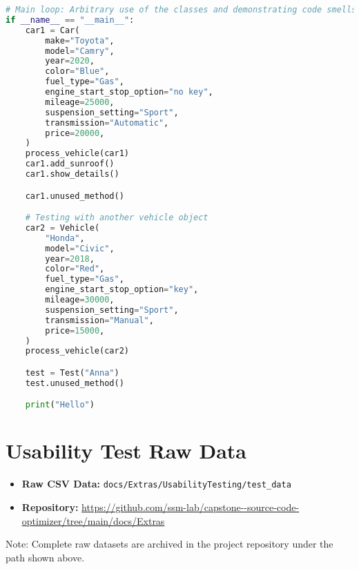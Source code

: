\documentclass{article}
\begin{document}
\begin{lstlisting}[language=Python,caption={Complex Class Structures (sample.py)},label=lst:task7]
# Main loop: Arbitrary use of the classes and demonstrating code smells
if __name__ == "__main__":
    car1 = Car(
        make="Toyota",
        model="Camry",
        year=2020,
        color="Blue",
        fuel_type="Gas",
        engine_start_stop_option="no key",
        mileage=25000,
        suspension_setting="Sport",
        transmission="Automatic",
        price=20000,
    )
    process_vehicle(car1)
    car1.add_sunroof()
    car1.show_details()

    car1.unused_method()

    # Testing with another vehicle object
    car2 = Vehicle(
        "Honda",
        model="Civic",
        year=2018,
        color="Red",
        fuel_type="Gas",
        engine_start_stop_option="key",
        mileage=30000,
        suspension_setting="Sport",
        transmission="Manual",
        price=15000,
    )
    process_vehicle(car2)

    test = Test("Anna")
    test.unused_method()

    print("Hello")

\end{lstlisting}


\section{Usability Test Raw Data}
\label{app:raw_data}

\begin{itemize}
    \item \textbf{Raw CSV Data:} \texttt{docs/Extras/UsabilityTesting/test\_data}
    \item \textbf{Repository:} \url{https://github.com/ssm-lab/capstone--source-code-optimizer/tree/main/docs/Extras}
\end{itemize}

\noindent
\footnotesize{Note: Complete raw datasets are archived in the project repository under the path shown above.}
\end{document}
